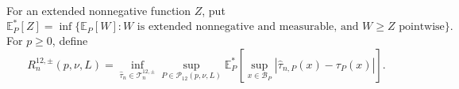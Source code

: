 For an extended nonnegative function \(Z\), put
\[
 \mathbb E_P^*[Z]=\inf\{\mathbb E_P[W]:W\text{ is extended nonnegative and measurable, and }W\geq Z\text{ pointwise}\}.
\]
For \(p\geq0\), define
\[
 R^{12,\pm}_n(p,\nu,L)=
 \inf_{\widehat\tau_n\in\mathcal T^{12,\pm}_n}
 \sup_{P\in\mathcal P_{12}(p,\nu,L)}
 \mathbb E_P^*\!\left[
 \sup_{x\in\mathcal B_P}|\widehat\tau_{n,P}(x)-\tau_P(x)|
 \right].
\]
